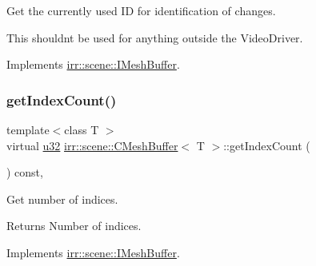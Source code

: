 Get the currently used ID for identification of changes. 

This shouldn\textquotesingle{}t be used for anything outside the Video\+Driver. 

Implements \hyperlink{classirr_1_1scene_1_1IMeshBuffer_aba48df31edf92a0117692c0be02298db}{irr\+::scene\+::\+I\+Mesh\+Buffer}.

\mbox{\label{classirr_1_1scene_1_1CMeshBuffer_ac5585f4983423a4ba1f4ab4aba112c95}} 
\subsubsection{\texorpdfstring{get\+Index\+Count()}{getIndexCount()}\hspace{0.1cm}{\footnotesize\ttfamily [1/2]}}
{\footnotesize\ttfamily template$<$class T $>$ \\
virtual \hyperlink{namespaceirr_a0416a53257075833e7002efd0a18e804}{u32} \hyperlink{classirr_1_1scene_1_1CMeshBuffer}{irr\+::scene\+::\+C\+Mesh\+Buffer}$<$ T $>$\+::get\+Index\+Count (\begin{DoxyParamCaption}{ }\end{DoxyParamCaption}) const\hspace{0.3cm}{\ttfamily [inline]}, {\ttfamily [virtual]}}



Get number of indices. 

\begin{DoxyReturn}{Returns}
Number of indices. 
\end{DoxyReturn}


Implements \hyperlink{classirr_1_1scene_1_1IMeshBuffer_a96e08662e15b1205516b87ada3301551}{irr\+::scene\+::\+I\+Mesh\+Buffer}.

\mbox{\label{classirr_1_1scene_1_1CMeshBuffer_ac5585f4983423a4ba1f4ab4aba112c95}} 
